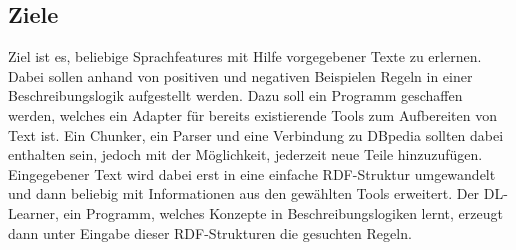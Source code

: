 \subsection{Ziele}
Ziel ist es, beliebige Sprachfeatures mit Hilfe vorgegebener Texte zu erlernen.
Dabei sollen anhand von positiven und negativen Beispielen Regeln in einer Beschreibungslogik aufgestellt werden.
Dazu soll ein Programm geschaffen werden, welches ein Adapter für bereits existierende Tools zum Aufbereiten von Text ist.
Ein Chunker, ein Parser und eine Verbindung zu DBpedia sollten dabei enthalten sein, jedoch mit der Möglichkeit, jederzeit neue Teile hinzuzufügen.
Eingegebener Text wird dabei erst in eine einfache RDF-Struktur umgewandelt und dann beliebig mit Informationen aus den gewählten Tools erweitert.
Der DL-Learner, ein Programm, welches Konzepte in Beschreibungslogiken lernt, erzeugt dann unter Eingabe dieser RDF-Strukturen die gesuchten Regeln.
\fi